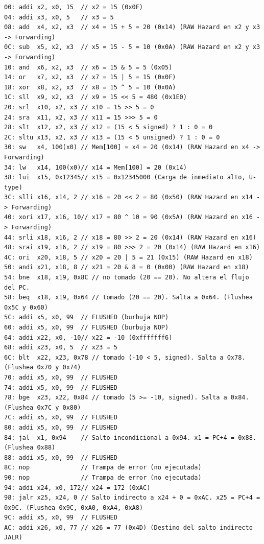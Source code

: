 \documentclass[12pt, a4paper]{article}
\begin{document}
\begin{lstlisting}[style=pseudo, caption={Programa Extra: test\_remaining\_ops.mem}]
00: addi x2, x0, 15  // x2 = 15 (0x0F)
04: addi x3, x0, 5   // x3 = 5
08: add  x4, x2, x3  // x4 = 15 + 5 = 20 (0x14) (RAW Hazard en x2 y x3 -> Forwarding)
0C: sub  x5, x2, x3  // x5 = 15 - 5 = 10 (0x0A) (RAW Hazard en x2 y x3 -> Forwarding)
10: and  x6, x2, x3  // x6 = 15 & 5 = 5 (0x05)
14: or   x7, x2, x3  // x7 = 15 | 5 = 15 (0x0F)
18: xor  x8, x2, x3  // x8 = 15 ^ 5 = 10 (0x0A)
1C: sll  x9, x2, x3  // x9 = 15 << 5 = 480 (0x1E0)
20: srl  x10, x2, x3 // x10 = 15 >> 5 = 0
24: sra  x11, x2, x3 // x11 = 15 >>> 5 = 0
28: slt  x12, x2, x3 // x12 = (15 < 5 signed) ? 1 : 0 = 0
2C: sltu x13, x2, x3 // x13 = (15 < 5 unsigned) ? 1 : 0 = 0
30: sw   x4, 100(x0) // Mem[100] = x4 = 20 (0x14) (RAW Hazard en x4 -> Forwarding)
34: lw   x14, 100(x0)// x14 = Mem[100] = 20 (0x14)
38: lui  x15, 0x12345// x15 = 0x12345000 (Carga de inmediato alto, U-type)
3C: slli x16, x14, 2 // x16 = 20 << 2 = 80 (0x50) (RAW Hazard en x14 -> Forwarding)
40: xori x17, x16, 10// x17 = 80 ^ 10 = 90 (0x5A) (RAW Hazard en x16 -> Forwarding)
44: srli x18, x16, 2 // x18 = 80 >> 2 = 20 (0x14) (RAW Hazard en x16)
48: srai x19, x16, 2 // x19 = 80 >>> 2 = 20 (0x14) (RAW Hazard en x16)
4C: ori  x20, x18, 5 // x20 = 20 | 5 = 21 (0x15) (RAW Hazard en x18)
50: andi x21, x18, 8 // x21 = 20 & 8 = 0 (0x00) (RAW Hazard en x18)
54: bne  x18, x19, 0x8C // no tomado (20 == 20). No altera el flujo del PC.
58: beq  x18, x19, 0x64 // tomado (20 == 20). Salta a 0x64. (Flushea 0x5C y 0x60)
5C: addi x5, x0, 99  // FLUSHED (burbuja NOP)
60: addi x5, x0, 99  // FLUSHED (burbuja NOP)
64: addi x22, x0, -10// x22 = -10 (0xfffffff6)
68: addi x23, x0, 5  // x23 = 5
6C: blt  x22, x23, 0x78 // tomado (-10 < 5, signed). Salta a 0x78. (Flushea 0x70 y 0x74)
70: addi x5, x0, 99  // FLUSHED
74: addi x5, x0, 99  // FLUSHED
78: bge  x23, x22, 0x84 // tomado (5 >= -10, signed). Salta a 0x84. (Flushea 0x7C y 0x80)
7C: addi x5, x0, 99  // FLUSHED
80: addi x5, x0, 99  // FLUSHED
84: jal  x1, 0x94    // Salto incondicional a 0x94. x1 = PC+4 = 0x88. (Flushea 0x88)
88: addi x5, x0, 99  // FLUSHED
8C: nop              // Trampa de error (no ejecutada)
90: nop              // Trampa de error (no ejecutada)
94: addi x24, x0, 172// x24 = 172 (0xAC)
98: jalr x25, x24, 0 // Salto indirecto a x24 + 0 = 0xAC. x25 = PC+4 = 0x9C. (Flushea 0x9C, 0xA0, 0xA4, 0xA8)
9C: addi x5, x0, 99  // FLUSHED
AC: addi x26, x0, 77 // x26 = 77 (0x4D) (Destino del salto indirecto JALR)
\end{lstlisting}
\end{document}
